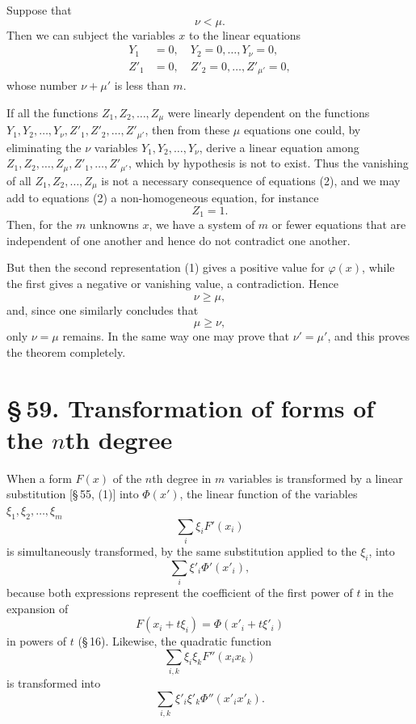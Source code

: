 \documentclass[11pt]{article}
\providecommand{\sect}[2]{\section*{\S\,#1. #2}}
\begin{document}
Suppose that
\[
 \nu<\mu.
\]
Then we can subject the variables $x$ to the linear equations
\begin{equation}
\begin{aligned}
 Y_1&=0,\quad Y_2=0,\ldots,Y_\nu=0,\\
 Z'_1&=0,\quad Z'_2=0,\ldots,Z'_{\mu'}=0,
\end{aligned}
\tag{2}
\end{equation}
whose number $\nu+\mu'$ is less than $m$.

If all the functions $Z_1,Z_2,\ldots,Z_\mu$ were linearly dependent on the functions $Y_1,Y_2,\ldots,Y_\nu,Z'_1,Z'_2,\ldots,Z'_{\mu'}$, then from these $\mu$ equations one could, by eliminating the $\nu$ variables $Y_1,Y_2,\ldots,Y_\nu$, derive a linear equation among $Z_1,Z_2,\ldots,Z_\mu,Z'_1,\ldots,Z'_{\mu'}$, which by hypothesis is not to exist. Thus the vanishing of all $Z_1,Z_2,\ldots,Z_\mu$ is not a necessary consequence of equations (2), and we may add to equations (2) a non-homogeneous equation, for instance
\[
 Z_1=1.
\]
Then, for the $m$ unknowns $x$, we have a system of $m$ or fewer equations that are independent of one another and hence do not contradict one another.

But then the second representation (1) gives a positive value for $\varphi(x)$, while the first gives a negative or vanishing value, a contradiction. Hence
\[
 \nu\geq \mu,
\]
and, since one similarly concludes that
\[
 \mu\geq \nu,
\]
only $\nu=\mu$ remains. In the same way one may prove that $\nu'=\mu'$, and this proves the theorem completely.

\sect{59}{Transformation of forms of the $n$th degree}

When a form $F(x)$ of the $n$th degree in $m$ variables is transformed by a linear substitution [\S\,55, (1)] into $\Phi(x')$, the linear function of the variables $\xi_1,\xi_2,\ldots,\xi_m$
\begin{equation}
 \sum_i \xi_i F'(x_i)
\tag{1}
\end{equation}
is simultaneously transformed, by the same substitution applied to the $\xi_i$, into
\begin{equation}
 \sum_i \xi'_i\Phi'(x'_i),
\tag{2}
\end{equation}
because both expressions represent the coefficient of the first power of $t$ in the expansion of
\[
 F(x_i+t\xi_i)=\Phi(x'_i+t\xi'_i)
\]
in powers of $t$ (\S\,16). Likewise, the quadratic function
\begin{equation}
 \sum_{i,k}\xi_i\xi_k F''(x_i x_k)
\tag{3}
\end{equation}
is transformed into
\begin{equation}
 \sum_{i,k}\xi'_i\xi'_k\Phi''(x'_i x'_k).
\tag{4}
\end{equation}
\end{document}
